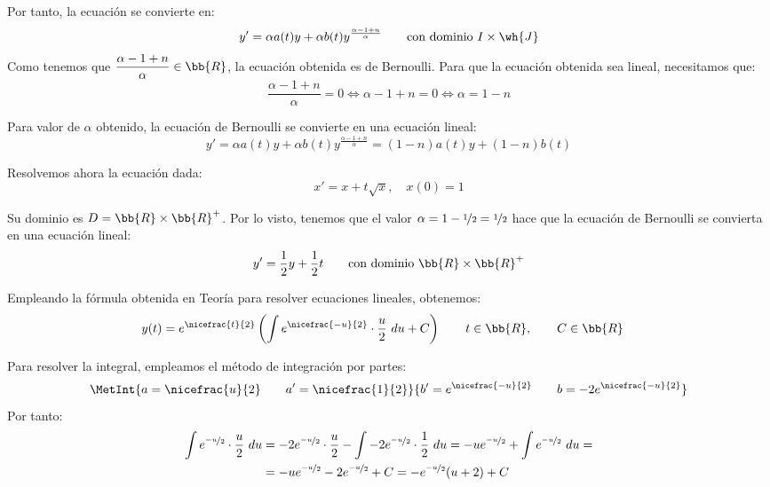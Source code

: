 \begin{ejercicio}
    Por tanto, la ecuación se convierte en:
    \begin{equation*}
        y' = \alpha a(t) y+ \alpha b(t)y^{\frac{\alpha-1+n}{\alpha}}\qquad \text{con dominio }I\times \wh{J}
    \end{equation*}
    Como tenemos que $\dfrac{\alpha-1+n}{\alpha}\in \bb{R}$, la ecuación obtenida es de Bernoulli.
    Para que la ecuación obtenida sea lineal, necesitamos que:
    \begin{equation*}
        \dfrac{\alpha-1+n}{\alpha} = 0 \Longleftrightarrow \alpha-1+n = 0 \Longleftrightarrow \alpha = 1-n
    \end{equation*}

    Para valor de $\alpha$ obtenido, la ecuación de Bernoulli se convierte en una ecuación lineal:
    \begin{equation*}
        y' = \alpha a(t) y+ \alpha b(t)y^{\frac{\alpha-1+n}{\alpha}} = (1-n)a(t)y + (1-n)b(t)
    \end{equation*}

    Resolvemos ahora la ecuación dada:
    \begin{equation*}
        x' = x + t\sqrt{x}, \quad x(0) = 1
    \end{equation*}

    Su dominio es $D=\bb{R}\times \bb{R}^+$.
    Por lo visto, tenemos que el valor $\alpha=1-\nicefrac{1}{2}=\nicefrac{1}{2}$ hace que la ecuación de Bernoulli se convierta en una ecuación lineal:
    \begin{equation*}
        y' = \dfrac{1}{2}y  + \dfrac{1}{2}t \qquad \text{con dominio }\bb{R}\times \bb{R}^+
    \end{equation*}

    Empleando la fórmula obtenida en Teoría para resolver ecuaciones lineales, obtenemos:
    \begin{align*}
        y(t) &= e^{\nicefrac{t}{2}}\left(\int e^{\nicefrac{-u}{2}}\cdot \frac{u}{2}~du + C\right) \qquad t\in \bb{R}, \qquad C\in \bb{R}
    \end{align*}

    Para resolver la integral, empleamos el método de integración por partes:
    \begin{equation*}
        \MetInt{a=\nicefrac{u}{2}\qquad a'=\nicefrac{1}{2}}{b'=e^{\nicefrac{-u}{2}}\qquad b=-2e^{\nicefrac{-u}{2}}}
    \end{equation*}
    Por tanto:
    \begin{align*}
        \int e^{\nicefrac{-u}{2}}\cdot \frac{u}{2}~du &= -2e^{\nicefrac{-u}{2}}\cdot \frac{u}{2} - \int -2e^{\nicefrac{-u}{2}}\cdot \frac{1}{2}~du = -ue^{\nicefrac{-u}{2}} + \int e^{\nicefrac{-u}{2}}~du =\\&= -ue^{\nicefrac{-u}{2}} - 2e^{\nicefrac{-u}{2}} + C
        = -e^{\nicefrac{-u}{2}}(u+2) + C
    \end{align*}


\end{ejercicio}
